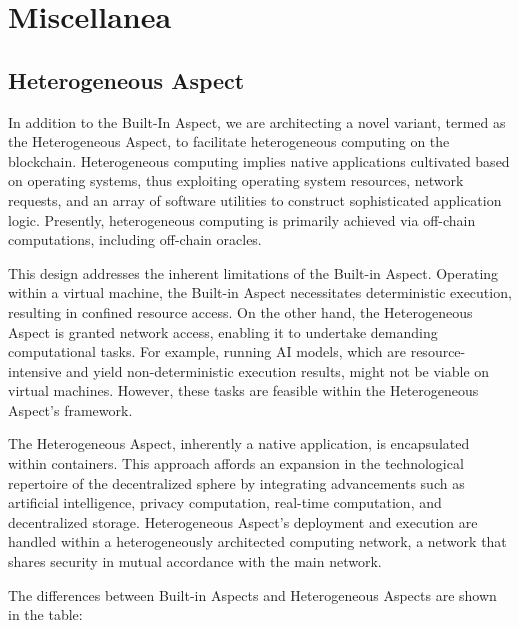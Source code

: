 \usepackage{graphicx}

\section{Miscellanea}

\subsection{Heterogeneous Aspect}

In addition to the Built-In Aspect, we are architecting a novel variant, termed as the Heterogeneous Aspect, to facilitate heterogeneous computing on the blockchain. Heterogeneous computing implies native applications cultivated based on operating systems, thus exploiting operating system resources, network requests, and an array of software utilities to construct sophisticated application logic. Presently, heterogeneous computing is primarily achieved via off-chain computations, including off-chain oracles.

This design addresses the inherent limitations of the Built-in Aspect. Operating within a virtual machine, the Built-in Aspect necessitates deterministic execution, resulting in confined resource access. On the other hand, the Heterogeneous Aspect is granted network access, enabling it to undertake demanding computational tasks. For example, running AI models, which are resource-intensive and yield non-deterministic execution results, might not be viable on virtual machines. However, these tasks are feasible within the Heterogeneous Aspect's framework.

The Heterogeneous Aspect, inherently a native application, is encapsulated within containers. This approach affords an expansion in the technological repertoire of the decentralized sphere by integrating advancements such as artificial intelligence, privacy computation, real-time computation, and decentralized storage. Heterogeneous Aspect's deployment and execution are handled within a heterogeneously architected computing network, a network that shares security in mutual accordance with the main network.

The differences between Built-in Aspects and Heterogeneous Aspects are shown in the table:

